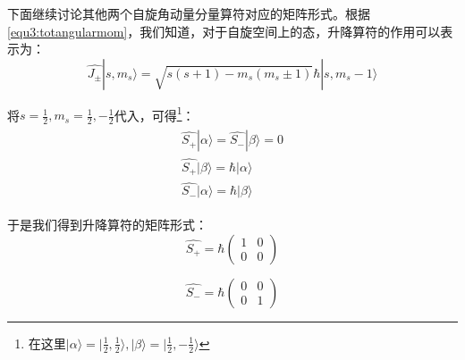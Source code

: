         下面继续讨论其他两个自旋角动量分量算符对应的矩阵形式。根据\ref{equ3:totangularmom}，我们知道，对于自旋空间上的态，升降算符的作用可以表示为：
        \begin{equation}
            \hat{J_\pm}|s,m_s\rangle=\sqrt{s(s+1)-m_s(m_s\pm 1)}\hbar |s,m_s-1\rangle
        \end{equation}
        
        将$s=\frac{1}{2},m_s=\frac{1}{2},-\frac{1}{2}$代入，可得\footnote{在这里$|\alpha\rangle=|\frac{1}{2},\frac{1}{2}\rangle,|\beta\rangle=|\frac{1}{2},-\frac{1}{2}\rangle$}：
        \begin{align}
            \begin{split}
                \hat{S_+}|\alpha\rangle=\hat{S_-}|\beta\rangle=0\\
                \hat{S_+}|\beta\rangle=\hbar |\alpha\rangle\\
                \hat{S_-}|\alpha\rangle=\hbar |\beta \rangle
            \end{split}
        \end{align}
        
        于是我们得到升降算符的矩阵形式：
        \begin{equation}
        \hat{S_+}=\hbar 
            \begin{pmatrix}
            1 & 0\\
            0 & 0
            \end{pmatrix}
        \end{equation}
        
        \begin{equation}
         \hat{S_-}=\hbar 
            \begin{pmatrix}
            0 & 0\\
            0 & 1
            \end{pmatrix}
        \end{equation}
        
